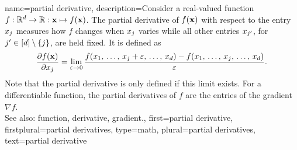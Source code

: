 {name={partial derivative},
	description={Consider a real-valued \gls{function} 
		$f: \mathbb{R}^{d} \rightarrow \mathbb{R}: {\bf x} \mapsto f({\bf x})$. 
	     	The partial \gls{derivative} of $f({\bf x})$ 
		with respect to the entry $x_{j}$ measures how  
		$f$ changes when $x_j$ varies while all 
        		other entries $x_{j'}$, for $j' \in [d] \setminus \{j \}$, 
		are held fixed. It is defined as \cite{RudinBookPrinciplesMatheAnalysis}
        		$$
            	\frac{\partial f({\bf x})}{\partial x_j}
            	= \lim_{\varepsilon \rightarrow 0} 
              	\frac{f(x_1,\,\ldots,\,x_{j}+\varepsilon,\,\ldots,\,x_d) 
			  - f(x_1,\,\ldots,\,x_j,\,\ldots,\,x_d)}{\varepsilon}.$$
		Note that the partial \gls{derivative} is only defined if this limit exists. 
		For a \gls{differentiable} \gls{function}, the partial \glspl{derivative} of $f$ are the entries 
		of the \gls{gradient} $\nabla f$. 
		\\
        		See also: \gls{function}, \gls{derivative}, \gls{gradient}.},
    	first={partial derivative},
	firstplural={partial derivatives},
	type=math, 
	plural={partial derivatives},
    	text={partial derivative}
}

